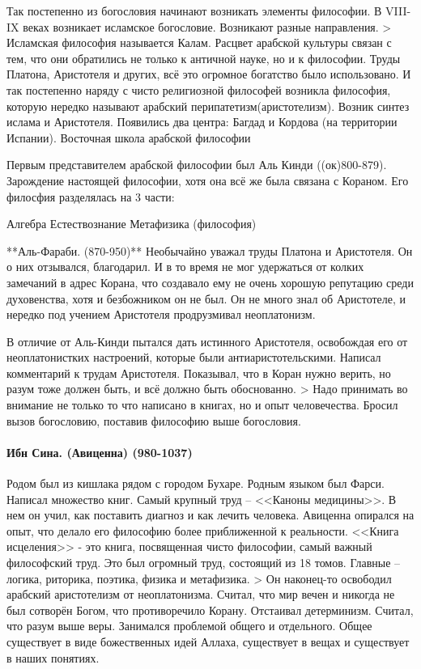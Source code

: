 Так постепенно из богословия начинают возникать элементы философии. В VIII-IX веках возникает исламское богословие. Возникают разные направления. > Исламская философия называется Калам. Расцвет арабской культуры связан с тем, что они обратились не только к античной науке, но и к философии. Труды Платона, Аристотеля и других, всё это огромное богатство было использовано. И так постепенно наряду с чисто религиозной философей возникла философия, которую нередко называют арабский перипатетизм(аристотелизм). Возник синтез ислама и Аристотеля. Появились два центра: Багдад и Кордова (на территории Испании).
Восточная школа арабской философии

Первым представителем арабской философии был Аль Кинди ((ок)800-879). Зарождение настоящей философии, хотя она всё же была связана с Кораном. Его филосфия разделялась на 3 части:

    Алгебра
    Естествознание
    Метафизика (философия)

    **Аль-Фараби. (870-950)**
    Необычайно уважал труды Платона и Аристотеля. Он о них отзывался, благодарил. И в то время не мог удержаться от колких замечаний в адрес Корана, что создавало ему не очень хорошую репутацию среди духовенства, хотя и безбожником он не был. Он не много знал об Аристотеле, и нередко под учением Аристотеля продрузмивал неоплатонизм.

В отличие от Аль-Кинди пытался дать истинного Аристотеля, освобождая его от неоплатонистких настроений, которые были антиаристотельскими. Написал комментарий к трудам Аристотеля. Показывал, что в Коран нужно верить, но разум тоже должен быть, и всё должно быть обоснованно. > Надо принимать во внимание не только то что написано в книгах, но и опыт человечества. Бросил вызов богословию, поставив философию выше богословия.

\paragraph{Ибн Сина. (Авиценна) (980-1037)}

Родом был из кишлака рядом с городом Бухаре. Родным языком был Фарси. Написал множество книг. Самый крупный труд – <<Каноны медицины>>. В нем он учил, как поставить диагноз и как лечить человека. Авиценна опирался на опыт, что делало его философию более приближенной к реальности. <<Книга исцеления>> - это книга, посвященная чисто философии, самый важный философский труд. Это был огромный труд, состоящий из 18 томов. Главные – логика, риторика, поэтика, физика и метафизика. > Он наконец-то освободил арабский аристотелизм от неоплатонизма. Считал, что мир вечен и никогда не был сотворён Богом, что противоречило Корану. Отстаивал детерминизм. Считал, что разум выше веры. Занимался проблемой общего и отдельного. Общее существует в виде божественных идей Аллаха, существует в вещах и существует в наших понятиях.

